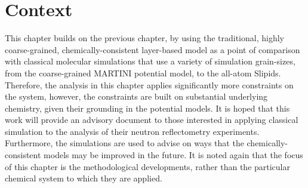 \section*{Context}
This chapter builds on the previous chapter, by using the traditional, highly coarse-grained, chemically-consistent layer-based model as a point of comparison with classical molecular simulations that use a variety of simulation grain-sizes, from the coarse-grained MARTINI potential model, to the all-atom Slipids.
Therefore, the analysis in this chapter applies significantly more constraints on the system, however, the constraints are built on substantial underlying chemistry, given their grounding in the potential models.
It is hoped that this work will provide an advisory document to those interested in applying classical simulation to the analysis of their neutron reflectometry experiments.
Furthermore, the simulations are used to advise on ways that the chemically-consistent models may be improved in the future.
It is noted again that the focus of this chapter is the methodological developments, rather than the particular chemical system to which they are applied.
